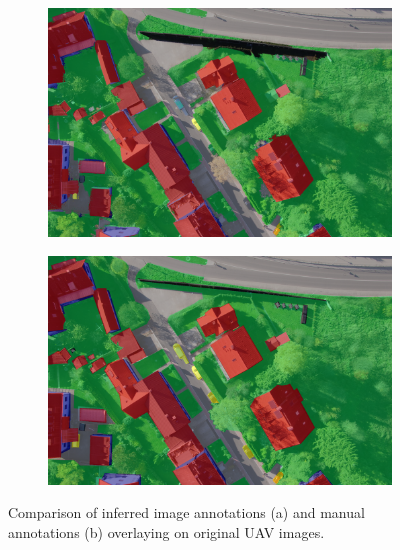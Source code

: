 \begin{figure}[htb]
\begin{subfigure}{0.49\columnwidth}
  \centering
  \includegraphics[width=1\linewidth]{fig/overlay/DSC00852_auto_lay.png}
\vspace{-0.35\baselineskip}
  \label{fig:sfig1}
  \caption{}
\end{subfigure}\hfill
\begin{subfigure}{0.49\columnwidth}
  \centering
  \includegraphics[width=1\linewidth]{fig/overlay/DSC00852_manual_lay.png}
\vspace{-0.35\baselineskip}
  \label{fig:sfig1}
  \caption{}
\end{subfigure}

\caption{Comparison of inferred image annotations (a) and manual annotations (b) overlaying on original UAV images.}
\label{fig:ei_inference}
\end{figure}

